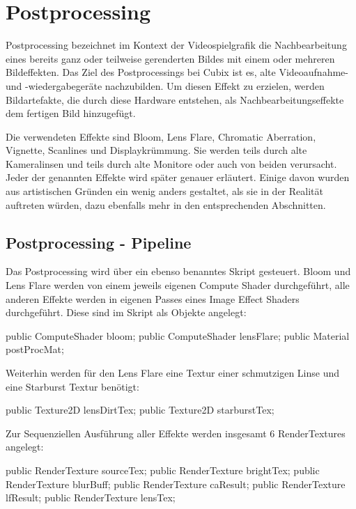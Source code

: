 
\section{Postprocessing}

Postprocessing bezeichnet im Kontext der Videospielgrafik die Nachbearbeitung eines bereits ganz oder teilweise gerenderten Bildes mit einem oder mehreren Bildeffekten. Das Ziel des Postprocessings bei Cubix ist es, alte Videoaufnahme- und -wiedergabegeräte nachzubilden. Um diesen Effekt zu erzielen, werden Bildartefakte, die durch diese Hardware entstehen, als Nachbearbeitungseffekte dem fertigen Bild hinzugefügt.

Die verwendeten Effekte sind Bloom, Lens Flare, Chromatic Aberration, Vignette, Scanlines und Displaykrümmung.
Sie werden teils durch alte Kameralinsen und teils durch alte Monitore oder auch von beiden verursacht.
Jeder der genannten Effekte wird später genauer erläutert. Einige davon wurden aus artistischen Gründen ein wenig anders gestaltet, als sie in der Realität auftreten würden, dazu ebenfalls mehr in den entsprechenden Abschnitten.



\subsection{Postprocessing - Pipeline}

Das Postprocessing wird über ein ebenso benanntes Skript gesteuert. Bloom und Lens Flare werden von einem jeweils eigenen Compute Shader durchgeführt, alle anderen Effekte werden in eigenen Passes eines Image Effect Shaders durchgeführt. Diese sind im Skript als Objekte angelegt:

\begin{csh}
    public ComputeShader bloom;
    public ComputeShader lensFlare;
    public Material postProcMat;
\end{csh}

Weiterhin werden für den Lens Flare eine Textur einer schmutzigen Linse und eine Starburst Textur benötigt:

\begin{csh}
    public Texture2D lensDirtTex;
    public Texture2D starburstTex;
\end{csh}

Zur Sequenziellen Ausführung aller Effekte werden insgesamt 6 RenderTextures angelegt:

\begin{csh}
    public RenderTexture sourceTex;
    public RenderTexture brightTex;
    public RenderTexture blurBuff;
    public RenderTexture caResult;
    public RenderTexture lfResult;
    public RenderTexture lensTex;
\end{csh}

